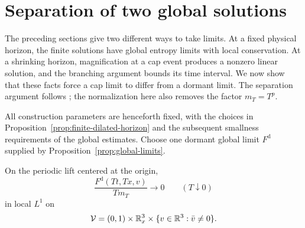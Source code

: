\section{Separation of two global solutions}\label{sec:separation}

The preceding sections give two different ways to take limits. At a
fixed physical horizon, the finite solutions have global entropy limits
with local conservation. At a shrinking horizon, magnification at a
cap event produces a nonzero linear solution, and the branching argument
bounds its time interval. We now show that these facts force a cap limit
to differ from a dormant limit. The separation argument follows
\cite[Section~10]{OpenAIPeriodic}; the normalization here also removes
the factor \(m_T=T^p\).

All construction parameters are henceforth fixed, with the choices in
Proposition~\ref{prop:finite-dilated-horizon} and the subsequent smallness
requirements of the global estimates. Choose one dormant global limit
\(F^{\mathrm d}\) supplied by Proposition~\ref{prop:global-limits}.

\begin{lemma}\label{sep:dormant-vanishing}
On the periodic lift centered at the origin,
\[
 \frac{F^{\mathrm d}(Tt,Tx,v)}{T m_T}\longrightarrow0
 \qquad(T\downarrow0)
\]
in local \(L^1\) on
\[
 \mathcal V=(0,1)\times\mathbb R^3_x\times
                 \{v\in\mathbb R^3:\bar v\ne0\}.
\]
\end{lemma}

